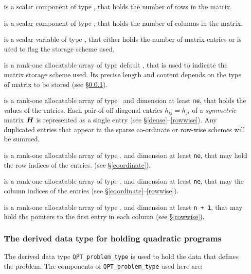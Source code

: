 \documentclass{galahad}
\begin{document}
\begin{description}

 is a scalar component of type \integer, 
that holds the number of rows in the matrix. 
 
 is a scalar component of type \integer, 
that holds the number of columns in the matrix. 
 
 is a scalar variable of type \integer, that either 
holds the number of matrix entries or is used to flag the storage scheme
used. 

 is a rank-one allocatable array of type default \character, that
is used to indicate the matrix storage scheme used. Its precise length and
content depends on the type of matrix to be stored (see \S\ref{typeqp}).

 is a rank-one allocatable array of type \realdp\, 
and dimension at least {\tt ne}, that holds the values of the entries. 
Each pair of off-diagonal entries $h_{ij} = h_{ji}$ of a {\em symmetric}
matrix ${\bm{H}}$ is represented as a single entry 
(see \S\ref{dense}--\ref{rowwise}).
Any duplicated entries that appear in the sparse 
co-ordinate or row-wise schemes will be summed. 

 is a rank-one allocatable array of type \integer, 
and dimension at least {\tt ne}, that may hold the row indices of the entries. 
(see \S\ref{coordinate}).

 is a rank-one allocatable array of type \integer, 
and dimension at least {\tt ne}, that may the column indices of the entries
(see \S\ref{coordinate}--\ref{rowwise}).

 is a rank-one allocatable array of type \integer, 
and dimension at least {\tt n + 1}, that may hold the pointers to
the first entry in each column (see \S\ref{rowwise}).

\end{description}


\subsubsection{The derived data type for holding quadratic programs}
\label{typeqp}

The derived data type 
{\tt QPT\_problem\_type}
is used to hold the data that defines the problem.
The components of 
{\tt QPT\_problem\_type} used here are:
\end{document}
